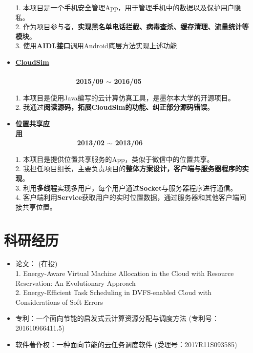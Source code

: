 \documentclass[letterpaper, UTF8, 11pt]{article}
\begin{document}
\begin{itemize}
		1. 本项目是一个手机安全管理App，用于管理手机中的数据以及保护用户隐私。\\
		2. 作为项目参与者，\textbf{实现黑名单电话拦截、病毒查杀、缓存清理、流量统计等模块}。\\
		3. 使用\textbf{AIDL接口}调用Android底层方法实现上述功能
		\vspace{0.01in}
		
		\item \textbf{\href{https://github.com/Hepsilion/cloudsim}{CloudSim}}  ~~~~~~~~~~~~~~~~~~~~~~~~~~~~~~~~~~~~~~~~~~~~~~~~~~~~~~~~~~~~~~~~~~~~~~~~~~~~~~~~~~~~~ \textbf{2015/09 $\sim$ 2016/05}
		
		1. 本项目是使用Java编写的云计算仿真工具，是墨尔本大学的开源项目。\\
		2. 我通过\textbf{阅读源码，拓展CloudSim的功能、纠正部分源码错误}。
		\vspace{0.01in}	
		
		\item \textbf{\href{https://github.com/Hepsilion/MapProject}{位置共享应用}}~~~~~~~~~~~~~~~~~~~~~~~~~~~~~~~~~~~~~~~~~~~~~~~~~~~~~~~~~~~~~~~~~~~~~~~~~~~~~~~~~~~~\textbf{2013/02 $\sim$ 2013/06}
		
		1. 本项目是提供位置共享服务的App，类似于微信中的位置共享。\\
		2. 我担任项目组长，主要负责项目的\textbf{整体方案设计，客户端与服务器程序的实现}。\\
		3. 利用\textbf{多线程}实现多用户，每个用户通过\textbf{Socket}与服务器程序进行通信。\\
		4. 客户端利用\textbf{Service}获取用户的实时位置数据，通过服务器和其他客户端间接共享位置。
		\vspace{0.01in}	
	\end{itemize}
	\vspace{-0.3in}
	
	\section*{\textbf{科研经历}}\vspace{-0.15in}
	\begin{itemize}	
		\item \small 论文： (在投)\\
		1. Energy-Aware Virtual Machine Allocation in the Cloud with Resource Reservation: An Evolutionary Approach\\
		2. Energy-Efficient Task Scheduling in DVFS-enabled Cloud with Considerations of Soft Errors
		\item 专利：一个面向节能的启发式云计算资源分配与调度方法 (专利号：201610966411.5)
		\item 软件著作权：一种面向节能的云任务调度软件 (受理号：2017R11S093585)
	\end{itemize}
	\vspace{-0.3in}
	
\end{document}
